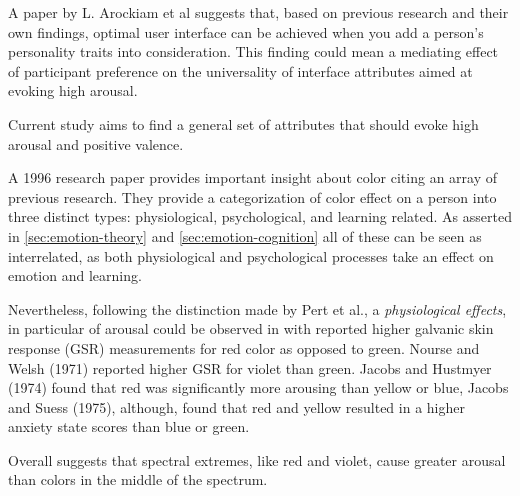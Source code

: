 		
		
		
		A paper by L. Arockiam et al \cite{Arockiam2013} suggests that, based on previous research and their own findings, optimal user interface can be achieved when you add a person's personality traits into consideration. This finding could mean a mediating effect of participant preference on the universality of interface attributes aimed at evoking high arousal. 
		
		Current study aims to find a general set of attributes that should evoke high arousal and positive valence.
		
		
		
		
		A 1996 research paper \cite{Pert1996} provides important insight about color citing an array of previous research. They provide a categorization of color effect on a person into three distinct types: physiological, psychological, and learning related. As asserted in \ref{sec:emotion-theory} and \ref{sec:emotion-cognition} all of these can be seen as interrelated, as both physiological and psychological processes take an effect on emotion and learning.
						
		Nevertheless, following the distinction made by Pert et al., a \textit{physiological effects}, in particular of arousal could be observed in \cite{Wilson1966} with reported higher galvanic skin response (GSR) measurements for red color as opposed to green. 
		Nourse and Welsh (1971) reported higher GSR for violet than green.
		Jacobs and Hustmyer (1974) found that red was significantly more arousing than yellow or blue, 
		Jacobs and Suess (1975), although, found that red and yellow resulted in a higher anxiety state scores than blue or green.
		
		Overall \cite{Pert1996} suggests that spectral extremes, like red and violet, cause greater arousal than colors in the middle of the spectrum.
		
